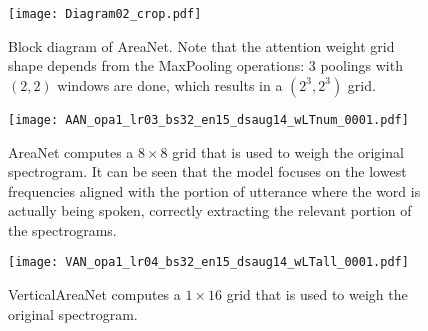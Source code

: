 \begin{figure}[h!]
    \centering
    \texttt{[image: Diagram02\_crop.pdf]}
    \caption{Block diagram of AreaNet.
        Note that the attention weight grid shape depends from the
        MaxPooling operations: $3$ poolings with $(2, 2)$ windows
        are done, which results in a $(2^3, 2^3)$ grid.
    }%
    \label{fig:areanet_diagram_blocks}
\end{figure}

\begin{figure}[t!]
    \centering
    \texttt{[image: AAN\_opa1\_lr03\_bs32\_en15\_dsaug14\_wLTnum\_0001.pdf]}
    \caption{AreaNet computes a $8 \times 8$ grid that is used to weigh the
    original spectrogram.
    It can be seen that the model focuses on the lowest frequencies aligned
    with the portion of utterance where the word is actually being spoken,
    correctly extracting the relevant portion of the spectrograms. }%
    \label{fig:attention_weights_area}
\end{figure}

\begin{figure}[t!]
    \centering
    \texttt{[image: VAN\_opa1\_lr04\_bs32\_en15\_dsaug14\_wLTall\_0001.pdf]}
    \caption{VerticalAreaNet computes a $1 \times 16$ grid that is used to
        weigh the original spectrogram.
    }%
    \label{fig:attention_weights_vertical}
\end{figure}

